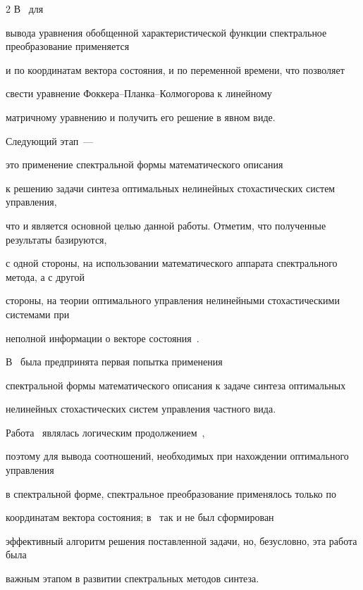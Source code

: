 \begin{multicols}{2}
В~\cite{PanRybSot, PanRyb} для 


вывода уравнения обобщенной характеристической функции спектральное преобразование применяется 


и по координатам вектора состояния, и по переменной времени, что позволяет 


свести уравнение Фок\-ке\-ра--План\-ка--Кол\-мо\-го\-ро\-ва к линейному 


мат\-рич\-но\-му уравнению и получить его решение в явном виде. 





Следующий этап~--- 


это применение спектральной формы математического описания 


к решению задачи синтеза оптимальных нелинейных стохастических систем управления, 


что и является основной целью данной работы. Отметим, что полученные результаты базируются, 


с одной стороны, на использовании математического аппарата спект\-раль\-но\-го метода, а с другой 


стороны, на теории оптимального управления нелинейными стохастическими сис\-те\-мами при 


неполной информации о векторе состояния~\cite{PanBor, Pan_Synt}. 





В~\cite{Sem_Synt_SPI_78} была предпринята первая попытка применения 


спектральной формы математического описания к задаче синтеза оптимальных 


нелинейных стохастических систем управления частного вида. 


Работа~\cite{Sem_Synt_SPI_78} являлась логическим продолжением~\cite{Sem_OHF_SPI_77}, 


поэтому для вывода соотношений, необходимых при нахождении оптимального управления 


в спектральной форме, спектральное преобразование применялось только по 


координатам вектора состояния; в~\cite{Sem_Synt_SPI_78} так и не был сформирован 


эффективный алгоритм решения поставленной задачи, но, безусловно, эта работа была 


важным этапом в развитии спектральных методов синтеза.






\end{multicols}
